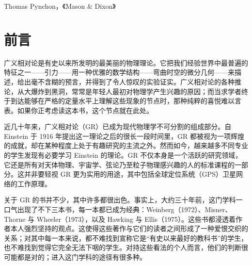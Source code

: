 

\clearpage
{}%
{Thomas Pynchon，《Mason \& Dixon》}
\clearpage

\chapter*{前言}

广义相对论是有史以来所发明的最美丽的物理理论。它把我们经验世界中最普遍的特征之一——引力——用一种优雅的数学结构——弯曲时空的微分几何——来描述，给出毫不含糊的预言，并得到了令人惊叹的实验证实。广义相对论的各种推论，从大爆炸到黑洞，常常是年轻人最初对物理学产生兴趣的原因；而当求学者终于到达能够在严格的定量水平上理解这些现象的节点时，那种纯粹的喜悦难以言表。如果你正考虑读这本书，这个节点就在此处。

近几十年来，广义相对论（GR）已成为现代物理学不可分割的组成部分。自 Einstein 于 1916 年提出这一理论之后的很长一段时间里，GR 都被视为一项辉煌的成就，却在某种程度上处于有趣研究的主流之外。然而如今，越来越多不同专业的学生发现有必要学习 Einstein 的理论。GR 不仅本身是一个活跃的研究领域，它还是所有对天体物理、宇宙学、弦论乃至粒子物理感兴趣的人的标准课程的一部分。这并非要轻视 GR 更为实用的用途，其中包括全球定位系统（GPS）卫星网络的工作原理。

关于 GR 的书并不少，其中许多都很出色。事实上，大约三十年前，这门学科一口气出现了不下三本书，每一本都已成为经典：Weinberg（1972）、Misner、Thorne 与 Wheeler（1973），以及 Hawking 与 Ellis（1975）。这些书都浸透着作者本人强烈坚持的观点。这使得这些著作与它们的读者之间形成了一种爱恨交织的关系；对其中每一本来说，都不难找到宣称它是“有史以来最好的教科书”的学生，也不难找到觉得它完全无法下咽的学生。对持这些看法的个人而言，他们的判断很可能都是对的；进入这门学科的途径有很多种。

